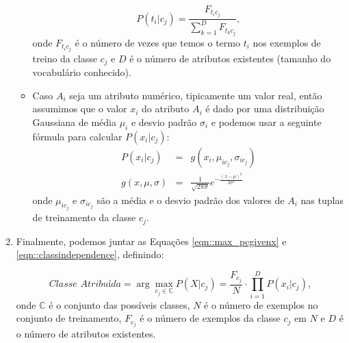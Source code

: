 \begin{enumerate}
\begin{itemize}
    \begin{equation}\label{eqn::nbcattexto}
        P(t_i|c_j) = \frac{ F_{t_{i}c_{j}} }{ \sum\limits^{D}_{k = 1} { } F_{t_{k}c_{j}} },
    \end{equation}
        onde $F_{t_{i}c_{j}}$ é o número de vezes que temos o termo $t_i$ nos exemplos de treino da classe $c_j$ e $D$ é o número de atributos existentes (tamanho do vocabulário conhecido).

        \item Caso $A_i$ seja um atributo numérico, tipicamente um valor real, então assumimos que o valor $x_i$ do atributo $A_i$ é dado por uma distribuição Gaussiana de média $\mu_i$ e desvio padrão $\sigma_i$ e podemos usar a seguinte fórmula para calcular $P(x_i|c_j)$:
    \begin{eqnarray}\label{eqn::nbnumerico}
        P(x_i|c_j) & = & g(x_i, \mu_{ic_j}, \sigma_{ic_j})  \\
        g(x, \mu, \sigma) & = & \frac {1} { \sqrt{2\pi\sigma} } e^{ -\frac{(x-\mu)^2}{2\sigma^2}  } 
    \end{eqnarray}
        onde $\mu_{ic_j}$ e $\sigma_{ic_j}$ são a média e o desvio padrão dos valores de $A_i$ nas tuplas de treinamento da classe $c_j$. 

    \end{itemize}

    \item Finalmente, podemos juntar as Equações \ref{eqn::max_pcgivenx} e \ref{eqn::classindependence}, definindo:

    \begin{equation}\label{eqn::nbfinal}
    \textit{Classe Atribuída} = \arg\max_{c_j \in \mathbb{C}}P(X|c_j) = \frac{F_{c_j}}{N} \cdot {\prod^{D}_{i=1}{P(x_i|c_j) }},
    \end{equation}
    onde $\mathbb{C}$ é o conjunto das possíveis classes, $N$ é o número de exemplos no conjunto de treinamento, $F_{c_j}$ é o número de exemplos da classe $c_j$ em $N$ e $D$ é o número de atributos existentes.


\end{enumerate}


